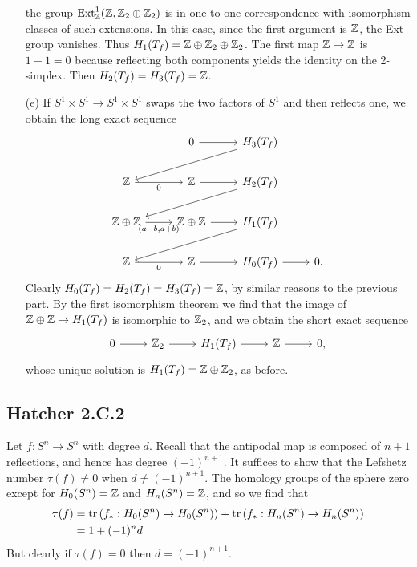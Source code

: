 \documentclass{../mathnotes}
\begin{document}
\begin{enumerate}[(a)]
        the group $\operatorname{Ext}^1_{\mathbb{Z}}(\mathbb{Z},\mathbb{Z}_2\oplus\mathbb{Z}_2)$ is in one to one correspondence with isomorphism
        classes of such extensions. In this case, since the first argument is $\mathbb{Z}$, the Ext group
        vanishes. Thus $H_1(T_f)=\mathbb{Z}\oplus\mathbb{Z}_2\oplus\mathbb{Z}_2$. The first map $\mathbb{Z}\to\mathbb{Z}$ is $1-1=0$
        because reflecting both components yields the identity on the 2-simplex. Then $H_2(T_f)=H_3(T_f)=\mathbb{Z}$.
    \item[(e)] If $S^1\times S^1\to S^1\times S^1$ swaps the two factors of $S^1$ and
        then reflects one, we obtain the long exact sequence
        \begin{equation*}
            \begin{tikzcd}
                \;&0\ar{r} & H_3(T_f)\ar{dll}\\
                \Z\ar[swap]{r}{0} & \Z\ar{r} & H_2(T_f)\ar{dll}\\
                \Z\oplus\Z\ar[swap]{r}{(a-b,a+b)} & \Z\oplus\Z\ar{r} & H_1(T_f)\ar{dll}\\
                \Z\ar[swap]{r}{0} & \Z\ar{r} & H_0(T_f)\ar{r} & 0.
            \end{tikzcd}
        \end{equation*}
        Clearly $H_0(T_f)=H_2(T_f)=H_3(T_f)=\mathbb{Z}$, by similar reasons to the previous part.
        By the first isomorphism theorem we find that the image of $\mathbb{Z}\oplus\mathbb{Z}\to H_1(T_f)$
        is isomorphic to $\mathbb{Z}_2$, and we obtain the short exact sequence
        \begin{equation*}
            \begin{tikzcd}
                0\ar{r} & \Z_2\ar{r} & H_1(T_f)\ar{r} & \Z\ar{r} & 0,
            \end{tikzcd}
        \end{equation*}
        whose unique solution is $H_1(T_f)=\mathbb{Z}\oplus\mathbb{Z}_2$, as before.
\end{enumerate}

\subsection*{Hatcher 2.C.2}

Let $f:S^n\to S^n$ with degree $d$. Recall that the antipodal map is composed of $n+1$
reflections, and hence has degree $(-1)^{n+1}$. It suffices to show that the Lefshetz
number $\tau(f)\neq0$ when $d\neq(-1)^{n+1}$. The homology groups of the sphere zero
except for $H_0(S^n)=\mathbb{Z}$ and $H_n(S^n)=\mathbb{Z}$, and so we find that
\begin{align*}
    \tau(f) &= \operatorname{tr}\left( f_*:H_0(S^n)\to H_0(S^n) \right)+\operatorname{tr}\left( f_*:H_n(S^n)\to H_n(S^n)\right)\\
    &= 1 + (-1)^nd
\end{align*}
But clearly if $\tau(f)=0$ then $d=(-1)^{n+1}$.
\end{document}
